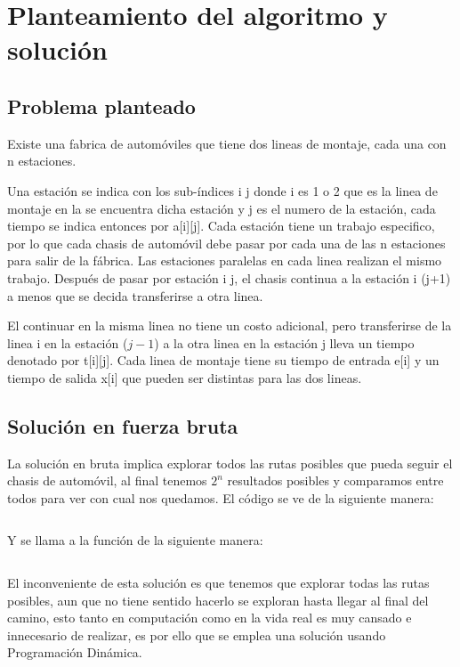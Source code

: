 \documentclass[12 pt]{report}
\begin{document}
\tableofcontents

\chapter{Planteamiento del algoritmo y solución}
\section{Problema planteado}
Existe una fabrica de automóviles que tiene dos lineas de montaje, cada una con n estaciones.

Una estación se indica con los sub-índices i j donde i es 1 o 2 que es la linea de montaje en la se encuentra dicha estación y j es el numero de la estación, cada tiempo se indica entonces por a[i][j]. Cada estación tiene un trabajo especifico, por lo que cada chasis de automóvil debe pasar por cada una de las n estaciones para salir de la fábrica. Las estaciones paralelas en cada linea realizan el mismo trabajo. Después de pasar por estación i j, el chasis continua a la estación i (j+1) a menos que se decida transferirse a otra linea.

El continuar en la misma linea no tiene un costo adicional, pero transferirse de la linea i en la estación ($j-1$) a la otra linea en la estación j lleva un tiempo denotado por t[i][j]. Cada linea de montaje tiene su tiempo de entrada e[i] y un tiempo de salida x[i] que pueden ser distintas para las dos lineas.
\section{Solución en fuerza bruta}
La solución en bruta implica explorar todos las rutas posibles que pueda seguir el chasis de automóvil, al final tenemos $2^n$ resultados posibles y comparamos entre todos para ver con cual nos quedamos. El código se ve de la siguiente manera:
\inputminted[firstline = 25, lastline=37]{C}{../solucionBruta.c}

Y se llama a la función de la siguiente manera:
\inputminted[firstline = 46, lastline=46]{C}{../solucionBruta.c}

El inconveniente de esta solución es que tenemos que explorar todas las rutas posibles, aun que no tiene sentido hacerlo se exploran hasta llegar al final del camino, esto tanto en computación como en la vida real es muy cansado e innecesario de realizar, es por ello que se emplea una solución usando Programación Dinámica.
\end{document}
